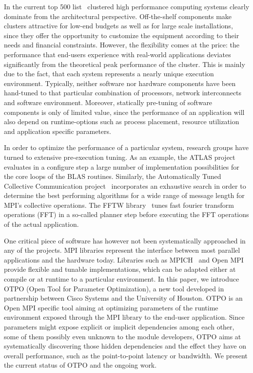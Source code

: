 In the current top 500 list~\cite{top500} clustered high performance computing systems clearly dominate from the architectural perspective. Off-the-shelf components make clusters attractive for low-end budgets as well as for large scale installations, since they offer the opportunity to customize the equipment according to their needs and financial constraints. However, the flexibility comes at the price: the performance that end-users experience with real-world applications deviates significantly from the theoretical peak performance of the cluster. This is mainly due to the fact, that each system represents a nearly unique execution environment. Typically, neither software nor hardware components have been hand-tuned to that particular combination of processors, network interconnects and software environment. Moreover, statically pre-tuning of software components is only of limited value, since the performance of an application will also depend on runtime-options such as process placement, resource utilization and application specific parameters.

In order to optimize the performance of a particular system, research groups have turned to extensive pre-execution tuning. As an example, the ATLAS project~\cite{atlas} evaluates in a configure step a large number of implementation possibilities for the core loops of the BLAS routines. Similarly, the Automatically Tuned Collective Communication project~\cite{pjesa:cluster} incorporates an exhaustive search in order to determine the best performing algorithms for a wide range of message length for MPI's collective operations.  The FFTW library~\cite{fftw} tunes fast fourier transform operations (FFT) in a so-called planner step before executing the FFT operations of the actual application.

One critical piece of software has however not been systematically approached in any of the projects. MPI libraries represent the interface between most parallel applications and the hardware today. Libraries such as MPICH~\cite{Gropp:1996:HPI} and Open MPI~\cite{gabriel:ompi} provide flexible and tunable implementations, which can be adapted either at compile or at runtime to a particular environment. In this paper, we introduce OTPO (Open Tool for Parameter Optimization), a new tool developed in partnership between Cisco Systems and the University of Houston. OTPO is an Open MPI specific tool aiming at optimizing parameters of the runtime environment exposed through the MPI library to the end-user application. Since parameters might expose explicit or implicit dependencies among each other, some of them possibly even unknown to the module developers, OTPO aims at systematically discovering those hidden dependencies and the effect they have on overall performance, such as the point-to-point latency or bandwidth. We present the current status of OTPO and the ongoing work.

